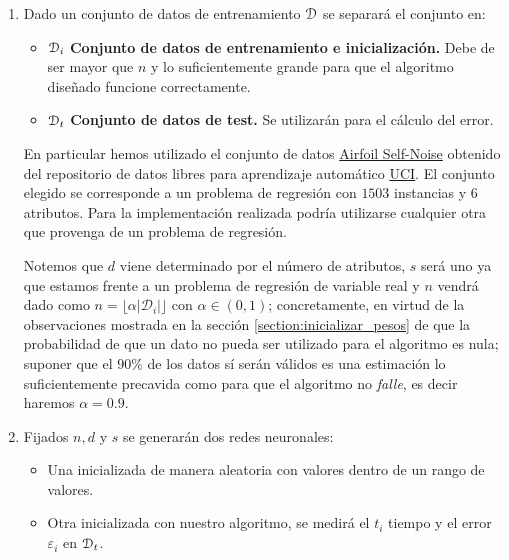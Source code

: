 \begin{enumerate}
\item Dado un conjunto de datos de entrenamiento $\mathcal{D}$  se separará el conjunto en:
\begin{itemize}
    \item $\mathcal{D}_i$ \textbf{Conjunto de 
    datos de entrenamiento e inicialización.} Debe de ser mayor que 
    $n$ y lo suficientemente grande para que el algoritmo diseñado funcione correctamente. 

    \item $\mathcal{D}_t$ \textbf{Conjunto de 
    datos de test.} Se utilizarán para el cálculo del error. 
\end{itemize} 

En particular hemos utilizado el conjunto de datos \href{https://archive.ics.uci.edu/ml/datasets/Airfoil+Self-Noise
    }{
        Airfoil Self-Noise} obtenido del repositorio de datos libres para aprendizaje automático \href{https://archive.ics.uci.edu/ml/datasets.php}{UCI}. 
El conjunto elegido se corresponde a un problema de regresión con $1503$ instancias y $6$ atributos. 
Para la implementación realizada podría utilizarse cualquier otra que provenga de un problema de regresión. 

Notemos que $d$ viene determinado por el número de atributos, 
$s$ será uno ya que estamos frente a un problema 
de regresión de variable real y $n$ vendrá dado como $n = \lfloor \alpha |\mathcal{D}_i| \rfloor$ con $\alpha \in (0,1)$; concretamente, en virtud de la observaciones mostrada en la sección \ref{section:inicializar_pesos} de que la probabilidad de que un dato no pueda ser utilizado para el algoritmo es nula; suponer que el $90\%$ de los datos sí serán válidos es una estimación lo suficientemente precavida como para que el algoritmo no \textit{falle}, es decir haremos    $\alpha = 0.9$. 

\item Fijados $n, d$ y $s$ se generarán dos redes neuronales: 

\begin{itemize}
    \item Una inicializada de manera aleatoria con valores dentro de un rango de valores. 
    
    \item  Otra inicializada con nuestro algoritmo, se medirá el $t_i$ tiempo y el error $\varepsilon_i$ en  $\mathcal{D}_t$. 
\end{itemize}


\end{enumerate}
